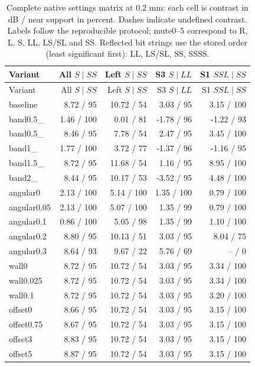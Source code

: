 \documentclass[11pt]{article}
\begin{document}
\begingroup\small\setlength{\tabcolsep}{3pt}
\begin{longtable}{@{}lrrrr@{}}
\caption{Complete native settings matrix at 0.2 mm: each cell is contrast in dB / near support in percent. Dashes indicate undefined contrast. Labels follow the reproducible protocol; mute0--5 correspond to R, L, S, LL, LS/SL and SS. Reflected bit strings use the stored order (least significant first): LL, LS/SL, SS, SSSS.}\label{saft:settings_matrix}\\
\toprule Variant & All $S\mid SS$ & Left $S\mid SS$ & S3 $S\mid LL$ & S1 $SSL\mid SS$\\\midrule\endfirsthead
\toprule Variant & All $S\mid SS$ & Left $S\mid SS$ & S3 $S\mid LL$ & S1 $SSL\mid SS$\\\midrule\endhead
baseline & 8.72 / 95 & 10.72 / 54 & 3.03 / 95 & 3.15 / 100\\
band0.5\_\allowbreak 3 & 1.46 / 100 & 0.01 / 81 & -1.78 / 96 & -1.22 / 93\\
band0.5\_\allowbreak 5 & 8.46 / 95 & 7.78 / 54 & 2.47 / 95 & 3.45 / 100\\
band1\_\allowbreak 3 & 1.77 / 100 & 3.72 / 77 & -1.37 / 96 & -1.16 / 95\\
band1.5\_\allowbreak 5 & 8.72 / 95 & 11.68 / 54 & 1.16 / 95 & 8.95 / 100\\
band2\_\allowbreak 5 & 8.44 / 95 & 10.17 / 53 & -3.52 / 95 & 4.48 / 100\\
angular0 & 2.13 / 100 & 5.14 / 100 & 1.35 / 100 & 0.79 / 100\\
angular0.05 & 2.13 / 100 & 5.07 / 100 & 1.35 / 99 & 0.79 / 100\\
angular0.1 & 0.86 / 100 & 5.05 / 98 & 1.35 / 99 & 1.10 / 100\\
angular0.2 & 8.80 / 95 & 10.13 / 51 & 3.03 / 95 & 8.04 / 75\\
angular0.3 & 8.64 / 93 & 9.67 / 22 & 5.76 / 69 & -- / 0\\
wall0 & 8.72 / 95 & 10.72 / 54 & 3.03 / 95 & 3.34 / 100\\
wall0.025 & 8.72 / 95 & 10.72 / 54 & 3.03 / 95 & 3.34 / 100\\
wall0.1 & 8.72 / 95 & 10.72 / 54 & 3.03 / 95 & 3.20 / 100\\
offset0 & 8.66 / 95 & 10.72 / 54 & 3.03 / 95 & 3.15 / 100\\
offset0.75 & 8.67 / 95 & 10.72 / 54 & 3.03 / 95 & 3.15 / 100\\
offset3 & 8.83 / 95 & 10.72 / 54 & 3.03 / 95 & 3.15 / 100\\
offset5 & 8.87 / 95 & 10.72 / 54 & 3.03 / 95 & 3.15 / 100\\

\end{longtable}
\end{document}
